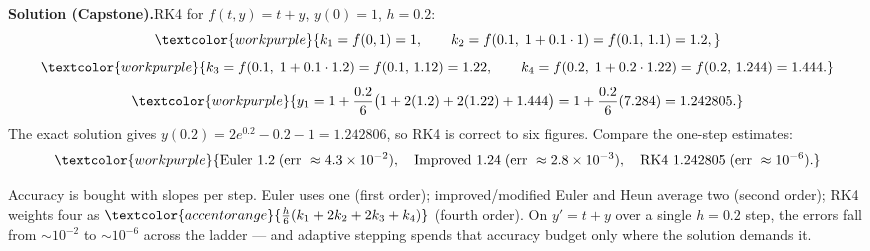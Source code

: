 \medskip
\noindent\textbf{Solution (Capstone).}\quad RK4 for $f(t,y)=t+y$, $y(0)=1$,
$h=0.2$:
\[ \textcolor{workpurple}{k_1 = f(0,1) = 1, \qquad k_2 = f(0.1,\;1+0.1\cdot 1) = f(0.1,\,1.1) = 1.2,} \]
\[ \textcolor{workpurple}{k_3 = f(0.1,\;1+0.1\cdot 1.2) = f(0.1,\,1.12) = 1.22, \qquad k_4 = f(0.2,\;1+0.2\cdot 1.22) = f(0.2,\,1.244) = 1.444.} \]
\[ \textcolor{workpurple}{y_1 = 1 + \frac{0.2}{6}\big(1 + 2(1.2) + 2(1.22) + 1.444\big) = 1 + \frac{0.2}{6}(7.284) = 1.242805.} \]
The exact solution gives $y(0.2) = 2e^{0.2} - 0.2 - 1 = 1.242806$, so RK4 is
correct to six figures. Compare the one-step estimates:
\[ \textcolor{workpurple}{\text{Euler } 1.2 \;(\text{err }\approx 4.3\times 10^{-2}), \quad
   \text{Improved } 1.24 \;(\text{err }\approx 2.8\times 10^{-3}), \quad
   \text{RK4 } 1.242805 \;(\text{err }\approx 10^{-6}).} \]

\vspace{0.8em}
\begin{conceptbox}
Accuracy is bought with slopes per step. \textcolor{accentorange}{Euler} uses one
(first order); \textcolor{accentorange}{improved/modified Euler and Heun} average
two (second order); \textcolor{accentorange}{RK4} weights four as
$\textcolor{accentorange}{\tfrac{h}{6}(k_1+2k_2+2k_3+k_4)}$ (fourth order). On
$y'=t+y$ over a single $h=0.2$ step, the errors fall from $\sim 10^{-2}$ to
$\sim 10^{-6}$ across the ladder --- and \textcolor{accentorange}{adaptive stepping}
spends that accuracy budget only where the solution demands it.
\end{conceptbox}


